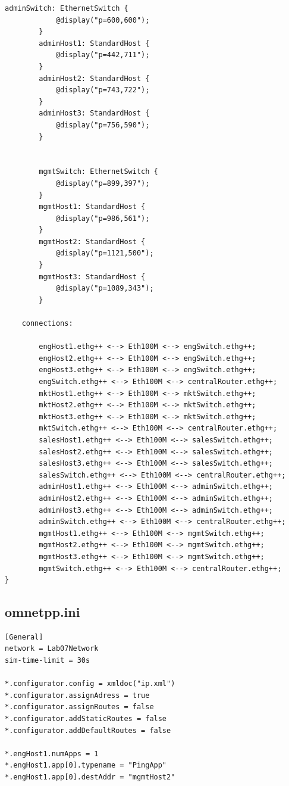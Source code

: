 \documentclass[11pt,a4paper]{article}
\begin{document}
\begin{lstlisting}[style=labcode]
        adminSwitch: EthernetSwitch {
            @display("p=600,600");
        }
        adminHost1: StandardHost {
            @display("p=442,711");
        }
        adminHost2: StandardHost {
            @display("p=743,722");
        }
        adminHost3: StandardHost {
            @display("p=756,590");
        }


        mgmtSwitch: EthernetSwitch {
            @display("p=899,397");
        }
        mgmtHost1: StandardHost {
            @display("p=986,561");
        }
        mgmtHost2: StandardHost {
            @display("p=1121,500");
        }
        mgmtHost3: StandardHost {
            @display("p=1089,343");
        }

    connections:

        engHost1.ethg++ <--> Eth100M <--> engSwitch.ethg++;
        engHost2.ethg++ <--> Eth100M <--> engSwitch.ethg++;
        engHost3.ethg++ <--> Eth100M <--> engSwitch.ethg++;
        engSwitch.ethg++ <--> Eth100M <--> centralRouter.ethg++;
        mktHost1.ethg++ <--> Eth100M <--> mktSwitch.ethg++;
        mktHost2.ethg++ <--> Eth100M <--> mktSwitch.ethg++;
        mktHost3.ethg++ <--> Eth100M <--> mktSwitch.ethg++;
        mktSwitch.ethg++ <--> Eth100M <--> centralRouter.ethg++;
        salesHost1.ethg++ <--> Eth100M <--> salesSwitch.ethg++;
        salesHost2.ethg++ <--> Eth100M <--> salesSwitch.ethg++;
        salesHost3.ethg++ <--> Eth100M <--> salesSwitch.ethg++;
        salesSwitch.ethg++ <--> Eth100M <--> centralRouter.ethg++;
        adminHost1.ethg++ <--> Eth100M <--> adminSwitch.ethg++;
        adminHost2.ethg++ <--> Eth100M <--> adminSwitch.ethg++;
        adminHost3.ethg++ <--> Eth100M <--> adminSwitch.ethg++;
        adminSwitch.ethg++ <--> Eth100M <--> centralRouter.ethg++;
        mgmtHost1.ethg++ <--> Eth100M <--> mgmtSwitch.ethg++;
        mgmtHost2.ethg++ <--> Eth100M <--> mgmtSwitch.ethg++;
        mgmtHost3.ethg++ <--> Eth100M <--> mgmtSwitch.ethg++;
        mgmtSwitch.ethg++ <--> Eth100M <--> centralRouter.ethg++;
}
\end{lstlisting}

\subsection*{omnetpp.ini}
\begin{lstlisting}[style=labcode]
[General]
network = Lab07Network
sim-time-limit = 30s

*.configurator.config = xmldoc("ip.xml")
*.configurator.assignAdress = true
*.configurator.assignRoutes = false
*.configurator.addStaticRoutes = false
*.configurator.addDefaultRoutes = false

*.engHost1.numApps = 1
*.engHost1.app[0].typename = "PingApp"
*.engHost1.app[0].destAddr = "mgmtHost2"
\end{lstlisting}
\end{document}
